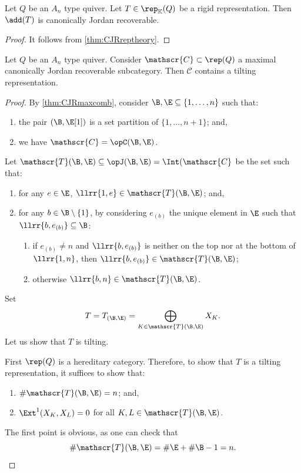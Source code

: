 \begin{prop} \label{prop:addTCJR}
    Let $Q$ be an $A_n$ type quiver. Let $T \in \rep_\mathbb{K}(Q)$ be a rigid representation. Then $\add(T)$ is canonically Jordan recoverable.
\end{prop}

\begin{proof}
   It follows from \cref{thm:CJRreptheory}.
\end{proof}

\begin{prop} \label{prop:existtiltmaxCJR}
    Let $Q$ be an $A_n$ type quiver. Consider $\mathscr{C} \subset \rep(Q)$ a maximal canonically Jordan recoverable subcategory. Then $\mathscr{C}$ contains a tilting representation.
\end{prop}

\begin{proof}
    By \cref{thm:CJRmaxcomb}, consider $\B,\E \subseteq \{1,\ldots,n\}$ such that: \begin{enumerate}[label=$\bullet$,itemsep=1mm]
        \item the pair $(\B,\E[1])$ is a set partition of $\{1,\ldots,n+1\}$; and, 
        \item we have $\mathscr{C} = \opC(\B,\E)$.
    \end{enumerate}  
    Let $\mathscr{T}(\B, \E) \subseteq \opJ(\B,\E) = \Int(\mathscr{C}$ be the set such that: 
    \begin{enumerate}[label=$\bullet$, itemsep=1mm]
        \item for any $e \in \E$, $\llrr{1,e} \in \mathscr{T}(\B,\E)$; and,
        \item for any $b \in \B \setminus \{1\}$, by considering $e_{(b)}$ the unique element in $\E$ such that $\llrr{b,e_{(b)}} \subseteq \B$:
        \begin{enumerate}[label=$\bullet$,itemsep=1mm]
            \item if $e_{(b)} \neq n$ and $\llrr{b,e_{(b)}}$ is neither on the top nor at the bottom of $\llrr{1,n}$, then $\llrr{b,e_{(b)}} \in \mathscr{T}(\B,\E)$; 
            \item otherwise $\llrr{b,n} \in \mathscr{T}(\B,\E)$.
        \end{enumerate}
    \end{enumerate} Set \[T = T_{(\B,\E)} = \bigoplus_{K \in \mathscr{T}(\B,\E)} X_{K}.\]
    Let us show that $T$ is tilting.
    
    First $\rep(Q)$ is a hereditary category. Therefore, to show that $T$ is a tilting representation, it suffices to show that:
    \begin{enumerate}[label=$\bullet$, itemsep=1mm]
        \item $\# \mathscr{T}(\B,\E) = n$; and,
        \item  $\Ext^1(X_K, X_L) = 0$ for all $K,L \in \mathscr{T}(\B,\E)$.
    \end{enumerate}
    The first point is obvious, as one can check that
    \[\#\mathscr{T}(\B,\E) = \#\E + \#\B - 1 = n.\]  
    

\end{proof}
